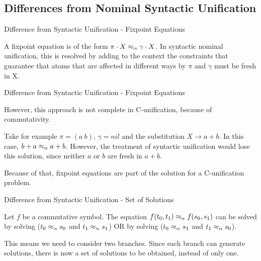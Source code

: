 \subsection{Differences from Nominal Syntactic Unification}
\begin{frame}{Difference from Syntactic Unification - Fixpoint Equations}
     \par A fixpoint equation is of the form $ \pi \cdot X \mathrel{\approx_\alpha} \gamma \cdot X$. 
     In syntactic nominal unification, this is resolved by adding to the context the
     constraints that guarantee that atoms that are affected in different ways by
     $\pi$ and $\gamma$ must be fresh in X.  
\end{frame}

\begin{frame}{Difference from Syntactic Unification - Fixpoint Equations}
     \par However, this approach is not complete in C-unification, because of
     commutativity. 
     \par Take for example $\pi = (a \ b)$, $\gamma = nil$ and the
     substitution $X \rightarrow a+b$. In this case, $b + a \mathrel{\approx_\alpha} a+b$. However,
     the treatment of syntactic unification would lose this solution, since neither
     $a$ or $b$ are fresh in $a+b$. 
     \par Because of that, fixpoint equations are part of the solution for a
     C-unification problem. 
\end{frame}

\begin{frame}{Difference from Syntactic Unification - Set of Solutions}
    \par Let $f$ be a commutative symbol. The equation $f(t_0, t_1) \mathrel{\approx_\alpha} f(s_0, s_1)$
    can be solved by solving ($t_0 \mathrel{\approx_\alpha} s_0$ and $t_1 \mathrel{\approx_\alpha} s_1$) OR by solving 
    ($t_0 \mathrel{\approx_\alpha} s_1$ and $t_1 \mathrel{\approx_\alpha} s_0$). 
    \newline
    \par This means we need to consider two branches. Since each branch can generate
    solutions, there is now a set of solutions to be obtained, instead of only one.  
\end{frame}


